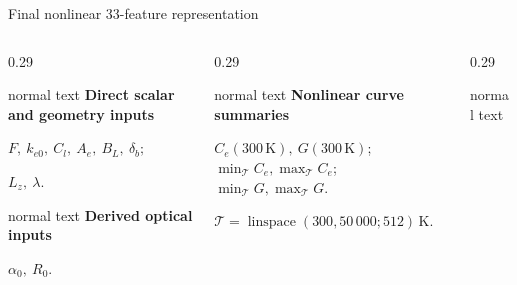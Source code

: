 \documentclass[aspectratio=169,10pt]{beamer}
\begin{document}
\begin{frame}[t]{\fontsize{13}{15}\selectfont Final nonlinear 33-feature representation}
  \hypertarget{supp:sampling-feature-definitions}{}
  \vspace{-0.18cm}\hfill
  \hspace{0.10cm}\GVBackupIndexButton
  \vspace{0.02cm}
  \begin{columns}[T,totalwidth=0.94\textwidth]
    \begin{column}{0.29\textwidth}
      \begin{beamercolorbox}[wd=\linewidth,sep=0.44em]{normal text}
        \small\textbf{\color{GVTeal}Direct scalar and geometry inputs}\par
        \vspace{0.07cm}
        \scriptsize \(F,\ k_{e0},\ C_l,\ A_e,\ B_L,\ \delta_b;\)\par
        \(L_z,\ \lambda\).
      \end{beamercolorbox}
      \vspace{0.15cm}
      \begin{beamercolorbox}[wd=\linewidth,sep=0.44em]{normal text}
        \small\textbf{\color{GVSourceBlue}Derived optical inputs}\par
        \vspace{0.07cm}\scriptsize \(\alpha_0,\ R_0\).
      \end{beamercolorbox}
    \end{column}
    \begin{column}{0.29\textwidth}
      \begin{beamercolorbox}[wd=\linewidth,sep=0.44em]{normal text}
        \small\textbf{\color{GVCapacityPurple}Nonlinear curve summaries}\par
        \vspace{0.07cm}
        \scriptsize \(C_e(300\,\mathrm K),\ G(300\,\mathrm K)\); \(\min_{\mathcal T}C_e,\max_{\mathcal T}C_e\); \(\min_{\mathcal T}G,\max_{\mathcal T}G\).\par
        \vspace{0.08cm}\tiny \(\mathcal T=\operatorname{linspace}(300,50\,000;512)\,\mathrm K\).
      \end{beamercolorbox}
    \end{column}
    \begin{column}{0.29\textwidth}
      \begin{beamercolorbox}[wd=\linewidth,sep=0.44em]{normal text}

\end{beamercolorbox}
\end{column}
\end{columns}
\end{frame}
\end{document}
